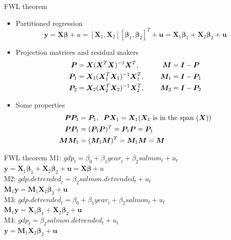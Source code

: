 \documentclass{beamer}
\begin{document}
\begin{frame}{FWL theorem}
\begin{itemize}
\item Partitioned regression
$$ \bm{y} = \bm{X}  \bm{\beta} + u = [\bm{X}_1, \bm{X}_2] [\bm{\beta}_1, \bm{\beta}_2]^T + \bm{u} = \bm{X}_1 \bm{\beta}_1 + \bm{X}_2 \bm{\beta}_2 + \bm{u}$$
\item Projection matrices and residual makers
\begin{align*}
\bm{P}  & = \bm{X}(\bm{X}^T\bm{X})^{-1}\bm{X}^T, \hspace{0.5cm}
& \bm{M} & = \bm{I} - \bm{P}\\
\bm{P}_1 & = \bm{X}_1(\bm{X}_1^T\bm{X}_1)^{-1}\bm{X}_1^T, \hspace{0.5cm} & \bm{M}_1 & =\bm{I}-\bm{P}_1\\
\bm{P}_2 & = \bm{X}_2 (\bm{X}_2^T\bm{X}_2)^{-1}\bm{X}_2^T, \hspace{0.5cm} & \bm{M}_2 & =\bm{I}-\bm{P}_2
\end{align*}
\item Some properties
\begin{align*}
\bm{P}\bm{P}_1 & = \bm{P}_1, \hspace{0.2cm} \bm{P}\bm{X}_1 = \bm{X}_1 \textnormal{($\bm{X}_1$ is in the span ($\bm{X}$))}\\
\bm{P}\bm{P}_1 & = (\bm{P}_1\bm{P})^T=\bm{P}_1\bm{P}=\bm{P}_1\\
\bm{M}\bm{M}_1 & = (\bm{M}_1\bm{M})^T=\bm{M}_1\bm{M}=\bm{M}
\end{align*}
\end{itemize}
\end{frame}


\begin{frame}{FWL theorem}
M1: $\textit{gdp}_t = \beta_0 + \beta_1 \textit{year}_t + \beta_2 \textit{salmon}_t + u_t$\\
$ \bm{y} = \bm{X}_1 \bm{\beta}_1 + \bm{X}_2 \bm{\beta}_2 + \bm{u}=\bm{X} \bm{\beta} + u$\\
\vspace{0.5cm}
M2: $\textit{gdp.detrended}_t = \beta_2 \textit{salmon.detrended}_t + u_t$\\
$\bm{M}_1 \bm{y} = \bm{M}_1\bm{X}_2\bm{\beta}_2+\bm{u}$\\
\vspace{0.5cm}
M3: $\textit{gdp.detrended}_t = \beta_0 + \beta_1 \textit{year}_t + \beta_2 \textit{salmon}_t + u_t$\\
$\bm{M}_1 \bm{y} = \bm{X}_1 \bm{\beta}_1 + \bm{X}_2\bm{\beta}_2+\bm{u}$\\
\vspace{0.5cm}
M4: $\textit{gdp}_t = \beta_2 \textit{salmon.detrended}_t + u_t$ \\
$\bm{y} = \bm{M}_1\bm{X}_2 \bm{\beta}_2 +\bm{u}$\\
\end{frame}
\end{document}
